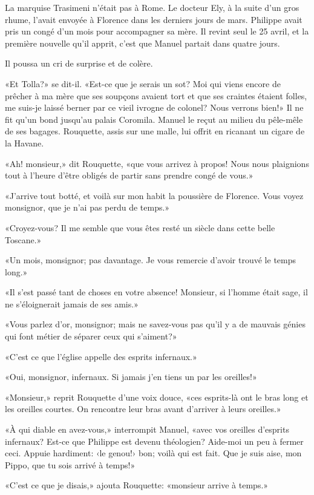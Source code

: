 La marquise Trasimeni n'était pas à Rome. Le docteur Ely, à la suite d'un gros rhume, l'avait envoyée à Florence dans les derniers jours de mars. Philippe avait pris un congé d'un mois pour accompagner sa mère. Il revint seul le 25 avril, et la première nouvelle qu'il apprit, c'est que Manuel partait dans quatre jours.

Il poussa un cri de surprise et de colère.

«Et Tolla?» se dit-il. «Est-ce que je serais un sot? Moi qui viens encore de prêcher à ma mère que ses soupçons avaient tort et que ses craintes étaient folles, me suis-je laissé berner par ce vieil ivrogne de colonel? Nous verrons bien!» Il ne fit qu'un bond jusqu'au palais Coromila. Manuel le reçut au milieu du pêle-mêle de ses bagages. Rouquette, assis sur une malle, lui offrit en ricanant un cigare de la Havane.

«Ah! monsieur,» dit Rouquette, «que vous arrivez à propos! Nous nous plaignions tout à l'heure d'être obligés de partir sans prendre congé de vous.»

«J'arrive tout botté, et voilà sur mon habit la poussière de Florence. Vous voyez monsignor, que je n'ai pas perdu de temps.»

«Croyez-vous? Il me semble que vous êtes resté un siècle dans cette belle Toscane.»

«Un mois, monsignor; pas davantage. Je vous remercie d'avoir trouvé le temps long.»

«Il s'est passé tant de choses en votre absence! Monsieur, si l'homme était sage, il ne s'éloignerait jamais de ses amis.»

«Vous parlez d'or, monsignor; mais ne savez-vous pas qu'il y a de mauvais génies qui font métier de séparer ceux qui s'aiment?»

«C'est ce que l'église appelle des esprits infernaux.»

«Oui, monsignor, infernaux. Si jamais j'en tiens un par les oreilles!»

«Monsieur,» reprit Rouquette d'une voix douce, «ces esprits-là ont le bras long et les oreilles courtes. On rencontre leur bras avant d'arriver à leurs oreilles.»

«À qui diable en avez-vous,» interrompit Manuel, «avec vos oreilles d'esprits infernaux? Est-ce que Philippe est devenu théologien? Aide-moi un peu à fermer ceci. Appuie hardiment: ‹le genou!› bon; voilà qui est fait. Que je suis aise, mon Pippo, que tu sois arrivé à temps!»

«C'est ce que je disais,» ajouta Rouquette: «monsieur arrive à temps.»


